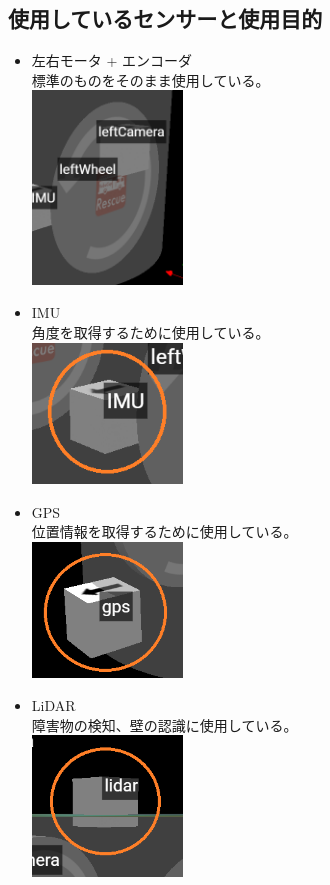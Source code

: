 \documentclass[dvipdfmx,a4paper]{jsarticle}
\begin{document}
    \subsection{使用しているセンサーと使用目的}
    \begin{itemize}
      \item 左右モータ + エンコーダ\\
      標準のものをそのまま使用している。\\
      \includegraphics[width=40mm]{Photo/Parts/ダウンロード.png}
      \item IMU\\
      角度を取得するために使用している。\\
      \includegraphics[width=40mm]{Photo/Parts/ダウンロード1.png}
      \item GPS\\
      位置情報を取得するために使用している。\\
      \includegraphics[width=40mm]{Photo/Parts/ダウンロード2.png}
      \item LiDAR\\
      障害物の検知、壁の認識に使用している。\\
      \includegraphics[width=40mm]{Photo/Parts/ダウンロード3.png}

\end{itemize}
\end{document}
